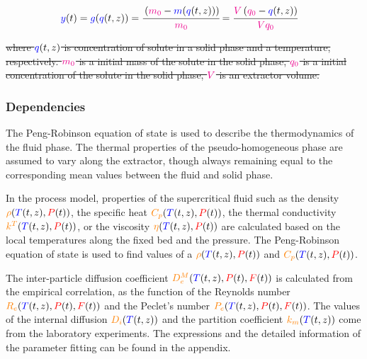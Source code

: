 \documentclass[../Parameter_fitting.tex]{subfiles}
\begin{document}
			
			{\footnotesize
				\begin{align} 
					\label{Model_measurment}
					{\color{blue}y}(t) ={\color{blue}g}({\color{blue}q}(t,z)) &= \cfrac{ \left({\color{magenta}m_0} - {\color{blue}m}({\color{blue}q}(t,z)) \right) }{{\color{magenta}m_0}} = \cfrac{ {\color{magenta}V} \left({\color{magenta}q_0} - {\color{blue}q}(t,z) \right) }{{\color{magenta}V q_0}} 
			\end{align}	}
			
			\sout{where ${\color{blue}q}(t,z)$ is concentration of solute in a solid phase and a temperature, respectively. ${\color{magenta}m_0}$ is a initial mass of the solute in the solid phase, ${\color{magenta}q_0}$ is a  initial concentration of the solute in the solid phase, ${\color{magenta}V}$ is an extractor volume.}
			
			\subsubsection{Dependencies} \label{CH: Dependencies}
			{\color{blue}The Peng-Robinson equation of state is used to describe the thermodynamics of the fluid phase. The thermal properties of the pseudo-homogeneous phase are assumed to vary along the extractor, though always remaining equal to the corresponding mean values between the fluid and solid phase. }
			
			In the process model, properties of the supercritical fluid such as the density ${\color{orange}\rho} ({\color{blue}T}(t,z),{\color{red}P}(t))$, the specific heat ${\color{orange}C_p}({\color{blue}T}(t,z),{\color{red}P}(t))$, the thermal conductivity ${\color{orange}k^T}({\color{blue}T}(t,z),{\color{red}P}(t))$, or the viscosity ${\color{orange}\eta}({\color{blue}T}(t,z),{\color{red}P}(t))$ are calculated based on the local temperatures along the fixed bed and the pressure. The Peng-Robinson equation of state is used to find values of a ${\color{orange}\rho} ({\color{blue}T}(t,z),{\color{red}P}(t))$ and ${\color{orange}C_p}({\color{blue}T}(t,z),{\color{red}P}(t))$.
			
			The inter-particle diffusion coefficient ${\color{orange}D^M_e}(\allowbreak{\color{blue}T}(t,z),{\color{red}P}(t),{\color{red}F}(t))$ is calculated from the empirical correlation, as the function of the Reynolds number ${\color{orange}R_e}({\color{blue}T}(t,z),{\color{red}P}(t),\allowbreak{\color{red}F}(t))$ and the Peclet's number ${\color{orange}P_e}({\color{blue}T}(t,z),\allowbreak{\color{red}P}(t),{\color{red}F}(t))$.
			The values of the internal diffusion ${\color{orange}D_i} ({\color{blue}T}(t,z))$ and the partition coefficient ${\color{orange}k_m} ({\color{blue}T}(t,z))$ come from the laboratory experiments. The expressions and the detailed information of the parameter fitting can be found in the appendix.
			
\end{document}
